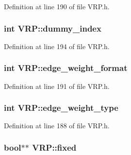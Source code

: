 Definition at line 190 of file VRP.h.

\hypertarget{class_v_r_p_a8f07dd3927e226e01c2f77f380c17ac3}{
\subsubsection[{dummy\_\-index}]{\setlength{\rightskip}{0pt plus 5cm}int {\bf VRP::dummy\_\-index}}}
\label{class_v_r_p_a8f07dd3927e226e01c2f77f380c17ac3}


Definition at line 194 of file VRP.h.

\hypertarget{class_v_r_p_a4de4cdf0660a89b599a3d2086698a27c}{
\subsubsection[{edge\_\-weight\_\-format}]{\setlength{\rightskip}{0pt plus 5cm}int {\bf VRP::edge\_\-weight\_\-format}}}
\label{class_v_r_p_a4de4cdf0660a89b599a3d2086698a27c}


Definition at line 191 of file VRP.h.

\hypertarget{class_v_r_p_aae0d4e2df1a97802b5c5f9e0c0757ef0}{
\subsubsection[{edge\_\-weight\_\-type}]{\setlength{\rightskip}{0pt plus 5cm}int {\bf VRP::edge\_\-weight\_\-type}}}
\label{class_v_r_p_aae0d4e2df1a97802b5c5f9e0c0757ef0}


Definition at line 188 of file VRP.h.

\hypertarget{class_v_r_p_ab4390370cb73c51ac6ebe12aaf51f2c4}{
\subsubsection[{fixed}]{\setlength{\rightskip}{0pt plus 5cm}bool$\ast$$\ast$ {\bf VRP::fixed}}}
\label{class_v_r_p_ab4390370cb73c51ac6ebe12aaf51f2c4}


